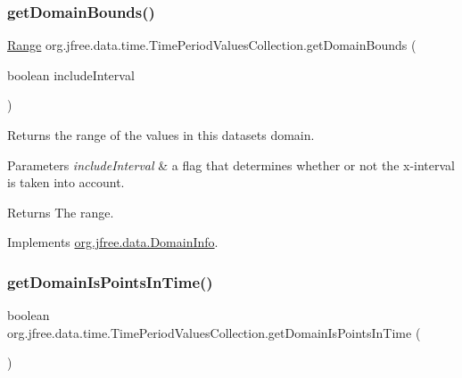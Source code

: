 \subsubsection{\texorpdfstring{get\+Domain\+Bounds()}{getDomainBounds()}}
{\footnotesize\ttfamily \mbox{\hyperlink{classorg_1_1jfree_1_1data_1_1_range}{Range}} org.\+jfree.\+data.\+time.\+Time\+Period\+Values\+Collection.\+get\+Domain\+Bounds (\begin{DoxyParamCaption}\item[{boolean}]{include\+Interval }\end{DoxyParamCaption})}

Returns the range of the values in this dataset\textquotesingle{}s domain.


\begin{DoxyParams}{Parameters}
{\em include\+Interval} & a flag that determines whether or not the x-\/interval is taken into account.\\
\hline
\end{DoxyParams}
\begin{DoxyReturn}{Returns}
The range. 
\end{DoxyReturn}


Implements \mbox{\hyperlink{interfaceorg_1_1jfree_1_1data_1_1_domain_info_aeb90c8bc6d27c82c39abc99622846732}{org.\+jfree.\+data.\+Domain\+Info}}.

\mbox{\label{classorg_1_1jfree_1_1data_1_1time_1_1_time_period_values_collection_ae6f476983f920ca19656d092894f653f}} 
\subsubsection{\texorpdfstring{get\+Domain\+Is\+Points\+In\+Time()}{getDomainIsPointsInTime()}}
{\footnotesize\ttfamily boolean org.\+jfree.\+data.\+time.\+Time\+Period\+Values\+Collection.\+get\+Domain\+Is\+Points\+In\+Time (\begin{DoxyParamCaption}{ }\end{DoxyParamCaption})}

